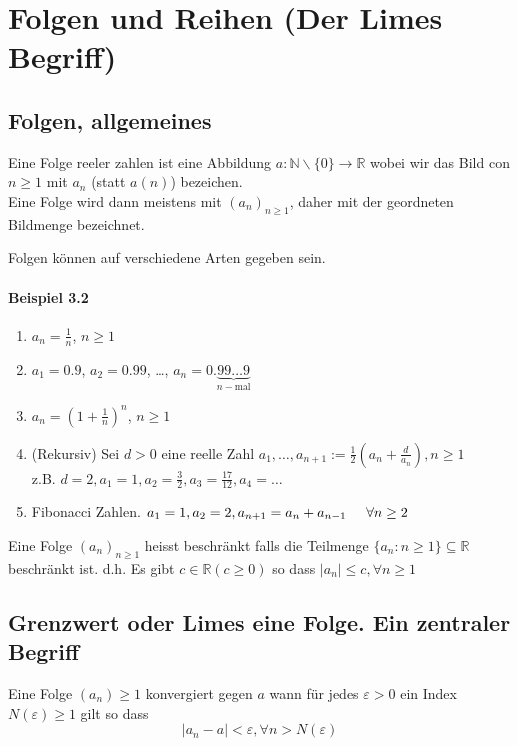 \chapter{Folgen und Reihen (Der Limes Begriff)}
\section{Folgen, allgemeines}
\begin{definition}{3.1}
Eine Folge reeler zahlen ist eine Abbildung $a:\mathbb{N}\backslash\{0\}\to\mathbb{R}$ wobei wir das Bild con $n\geq 1$ mit $a_n$ (statt $a(n)$) bezeichen.\\

Eine Folge wird dann meistens mit $(a_n)_{n\geq 1}$, daher mit der geordneten Bildmenge bezeichnet.
\end{definition}

\noindent  Folgen können auf verschiedene Arten gegeben sein.
\subsubsection*{Beispiel 3.2}
\begin{enumerate}
\item $a_n=\frac{1}{n}$, $n\geq 1$
\item $a_1=0.9$, $a_2=0.99$, \dots, ${a_n} = 0.\underbrace {99 \ldots 9}_{n-\text{mal}}$
\item $a_n=\left( 1+\frac{1}{n}\right)^n$, $n\geq 1$
\item (Rekursiv) Sei $d>0$ eine reelle Zahl $a_1,\dots, a_{n+1}:=\frac{1}{2}\left( a_n + \frac{d}{a_n}\right), n\geq 1$\\
z.B. $d=2,a_1=1,a_2=\frac{3}{2},a_3=\frac{17}{12},a_4=\dots$
\item Fibonacci Zahlen. $a_1=1,a_2=2, a_{n+1}=a_n+a_{n-1}\hspace{5mm}\forall n\geq 2$
\end{enumerate}

\begin{definition}{3.3}
Eine Folge $(a_n)_{n\geq 1}$ heisst beschränkt falls die Teilmenge $\{a_n:n\geq 1\}\subseteq\mathbb{R}$ beschränkt ist. d.h. Es gibt $c\in\mathbb{R} (c\geq 0)$ so dass $\left| a_n\right| \leq c, \forall n\geq 1$ 
\end{definition}

\section{Grenzwert oder Limes eine Folge. Ein zentraler Begriff}
\begin{definition}{3.4}
Eine Folge $(a_n)\geq 1$ konvergiert gegen $a$ wann für jedes $\varepsilon>0$ ein Index $N(\varepsilon)\geq 1$ gilt so dass \[  \left| a_n-a\right| <\varepsilon, \forall n>N(\varepsilon)\] 
\end{definition}

